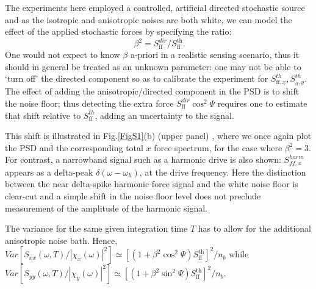 \documentclass[twocolumn,english,notitlepage,superscriptaddress,nofootinbib]{revtex4-2}
\begin{document}
The experiments here employed a controlled,  artificial directed stochastic source 
and as the isotropic and anisotropic noises are both white,   we can model the effect of the applied stochastic forces  by specifying the ratio:
 \begin{equation}\
\beta^2 = S_{\text{ff}}^{dir}/S^{\text{th}}_{\text{ff}}.
\end{equation}
One would not expect to know $\beta$ a-priori in a realistic sensing scenario,  thus it should in general be treated as an unknown parameter: one may not be able to  `turn off' the directed component so as to calibrate the experiment for 
$S^{th}_{\text{ff},x},S^{th}_{_{\text{ff}},y}$.  The effect of adding the anisotropic/directed component in the PSD is to shift the noise floor; thus detecting the extra force $ S^{dir}_{\text{ff}} \cos^2 \Psi $ requires one  to estimate that shift relative to $ S^{th}_{\text{ff}}$,  adding an uncertainty to the signal.


This shift  is illustrated in  Fig.\ref{FigS1}(b) (upper panel) , where we once again plot the PSD and the corresponding total $x$ force spectrum, for the case where  $\beta^2=3$.  
For contrast,  a narrowband signal such as a harmonic drive is also shown: $S^{harm}_{ff,x}$  appears as a delta-peak $\delta(\omega-\omega_h)$,  at the drive frequency.   Here the distinction between the near delta-spike harmonic force signal and the white noise floor is clear-cut and a simple shift in the noise floor level does not preclude measurement of the amplitude of the harmonic signal.

The variance for the same given integration time $T$ has to allow for the additional anisotropic noise bath. Hence, $Var[S_{xx}(\omega,T)/|\chi_x(\omega)|^2 ] \simeq  [(1+\beta^2\cos^2 \Psi)  S^{\text{th}}_{\text{ff}}]^2/n_b$ while 
$Var[S_{yy}(\omega,T)/|\chi_y(\omega)|^2] \simeq  [(1+\beta^2\sin^2 \Psi)  S^{\text{th}}_{\text{ff}}]^2/n_b$. 
\end{document}
